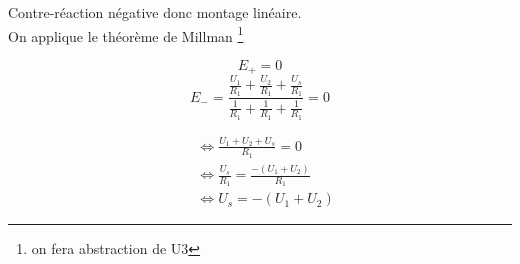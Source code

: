 \documentclass[12pt]{report}
\begin{document}
Contre-réaction négative donc montage linéaire. \\
On applique le théorème de Millman \footnote{on fera abstraction de U3}

$$E_+=0$$
$$ E_- = \frac{ \frac{U_1}{R_1} + \frac{U_2}{R_1} + \frac{U_s}{R_1} }{\frac{1}{R_1} + \frac{1}{R_1} + \frac{1}{R_1}}=0$$

\begin{align}
&\Leftrightarrow \frac{U_1+U_2+U_s}{R_1}=0 \\
&\Leftrightarrow \frac{U_s}{R_1} = \frac{-(U_1+U_2)}{R_1} \\
&\Leftrightarrow U_s = -(U_1+U_2)
\end{align}
\end{document}
